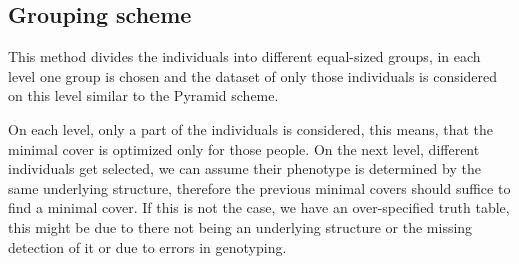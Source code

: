 \documentclass[letterpaper, 11pt]{article}
\begin{document}
\subsection{Grouping scheme}
This method divides the individuals into different equal-sized groups, in each level one group is chosen and the dataset of only those individuals is considered on this level similar to the Pyramid scheme. 

On each level, only a part of the individuals is considered, this means, that the minimal cover is optimized only for those people. On the next level, different individuals get selected, we can assume their phenotype is determined by the same underlying structure, therefore the previous minimal covers should suffice to find a minimal cover. If this is not the case, we have an over-specified truth table, this might be due to there not being an underlying structure or the missing detection of it or due to errors in genotyping. 
\begin{figure} [!h] 
\end{figure}
\end{document}
